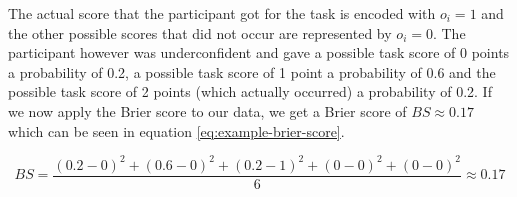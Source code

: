 \documentclass[../main/main.tex]{subfiles}
\begin{document}
	The actual score that the participant got for the task is encoded with $o_i = 1$ and the other possible scores that did not occur are represented by $o_i = 0$. The participant however was underconfident and gave a possible task score of 0 points a probability of 0.2, a possible task score of 1 point a probability of 0.6 and the possible task score of 2 points (which actually occurred) a probability of 0.2. If we now apply the Brier score to our data, we get a Brier score of $BS \approx 0.17$ which can be seen in equation \ref{eq:example-brier-score}.
	
	\begin{equation}
		\label{eq:example-brier-score}
		BS = \frac{(0.2 - 0)^2 + (0.6 - 0)^2 + (0.2 - 1)^2 + (0 - 0)^2 + (0 - 0)^2}{6} \approx 0.17
	\end{equation}
\end{document}
